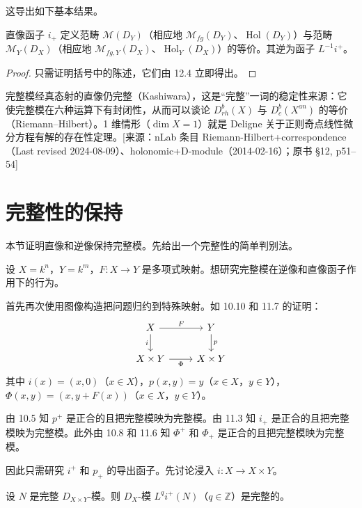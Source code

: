 这导出如下基本结果。

\begin{theorem}[Kashiwara]
直像函子 $i_+$ 定义范畴 $\mathcal{M}(D_Y)$（相应地 $\mathcal{M}_{fg}(D_Y)$、$\operatorname{Hol}(D_Y)$）与范畴 $\mathcal{M}_Y(D_X)$（相应地 $\mathcal{M}_{fg,Y}(D_X)$、$\operatorname{Hol}_Y(D_X)$）的等价。其逆为函子 $L^{-1}i^+$。
\end{theorem}

\begin{proof}
只需证明括号中的陈述，它们由 12.4 立即得出。
\end{proof}
\begin{annote}
完整模经真态射的直像仍完整（Kashiwara），这是“完整”一词的稳定性来源：它使完整模在六种运算下有封闭性，从而可以谈论 $D^b_{rh}(X)$ 与 $D^b_c(X^{an})$ 的等价（Riemann–Hilbert）。1 维情形（$\dim X=1$）就是 Deligne 关于正则奇点线性微分方程有解的存在性定理。[来源：nLab 条目 Riemann-Hilbert+correspondence（Last revised 2024-08-09）、holonomic+D-module（2014-02-16）；原书 §12, p51–54]
\end{annote}



\section{完整性的保持}

本节证明直像和逆像保持完整模。先给出一个完整性的简单判别法。

设 $X=k^n$，$Y=k^m$，$F:X\to Y$ 是多项式映射。想研究完整模在逆像和直像函子作用下的行为。

首先再次使用图像构造把问题归约到特殊映射。如 10.10 和 11.7 的证明：
$$\begin{tikzcd}
X \arrow[r,"F"] \arrow[d,"i"' ] & Y \arrow[d,"p"]\\
X\times Y \arrow[r,"\Phi"'] & X\times Y
\end{tikzcd}$$
其中 $i(x)=(x,0)$（$x\in X$），$p(x,y)=y$（$x\in X$，$y\in Y$），$\Phi(x,y)=(x,y+F(x))$（$x\in X$，$y\in Y$）。

由 10.5 知 $p^+$ 是正合的且把完整模映为完整模。由 11.3 知 $i_+$ 是正合的且把完整模映为完整模。此外由 10.8 和 11.6 知 $\Phi^+$ 和 $\Phi_+$ 是正合的且把完整模映为完整模。

因此只需研究 $i^+$ 和 $p_+$ 的导出函子。先讨论浸入 $i:X\to X\times Y$。

\begin{lemma}
设 $N$ 是完整 $D_{X\times Y}$-模。则 $D_X$-模 $L^qi^+(N)$（$q\in\mathbb{Z}$）是完整的。
\end{lemma}

